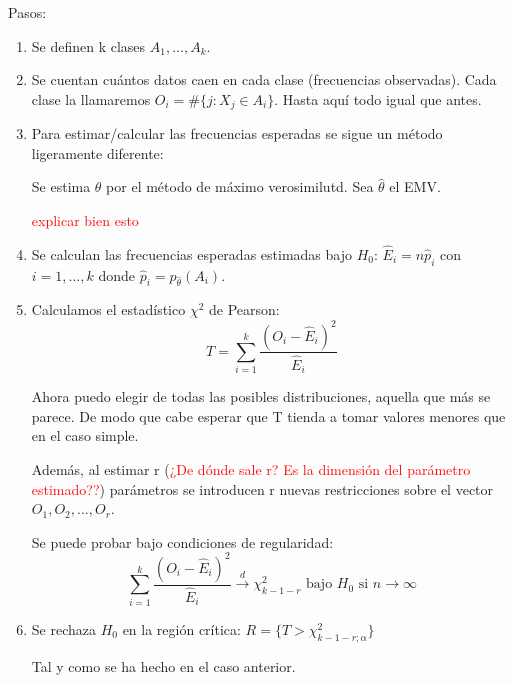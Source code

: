 \documentclass[nochap]{apuntes}
\begin{document}
Pasos:
\begin{enumerate}
\item Se definen k clases $A_1,...,A_k$. 

\item Se cuentan cuántos datos caen en cada clase (frecuencias observadas). Cada clase la llamaremos $O_i=\#\{j:X_j\in A_i\}$. Hasta aquí todo igual que antes.

\item Para estimar/calcular las frecuencias esperadas se sigue un método ligeramente diferente:

Se estima $\theta$ por el método de máximo verosimilutd. Sea $\hat{\theta}$ el EMV.

\textcolor{red}{explicar bien esto}

\item Se calculan las frecuencias esperadas estimadas bajo $H_0$: $\hat{E}_i=n\hat{p}_i$ con $i=1,...,k$ donde $\hat{p}_i = p_{\hat{\theta}}(A_i)$.

\item Calculamos el estadístico $\chi^2$ de Pearson:
\[
T=\sum_{i=1}^k \frac{(O_i-\hat{E}_i)^2}{\hat{E}_i}
\]

Ahora puedo elegir de todas las posibles distribuciones, aquella que más se parece. De modo que cabe esperar que T tienda a tomar valores menores que en el caso simple.

Además, al estimar r (\textcolor{red}{¿De dónde sale r? Es la dimensión del parámetro estimado??}) parámetros se introducen r nuevas restricciones sobre el vector $O_1,O_2,...,O_r$.

Se puede probar bajo condiciones de regularidad:
\[
\sum_{i=1}^k \frac{(O_i-\hat{E}_i)^2}{\hat{E}_i} \stackrel{d}{\rightarrow} \chi^2_{k-1-r} \text{ bajo } H_0 \text{ si } n \rightarrow \infty
\]

\item Se rechaza $H_0$ en la región crítica: $R=\{T>\chi^2_{k-1-r;\alpha}  \}$

Tal y como se ha hecho en el caso anterior.

\end{enumerate}
\end{document}
